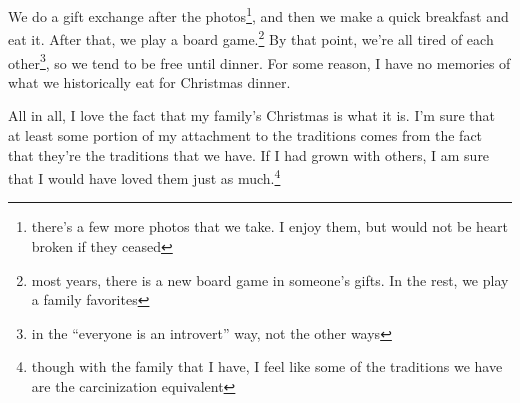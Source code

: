 \documentclass[12pt]{article}[titlepage]
\newcommand{\say}[1]{``#1''}
\newcommand{\1}{\={a}}
\newcommand{\2}{\={e}}
\newcommand{\3}{\={\i}}
\newcommand{\4}{\=o}
\newcommand{\5}{\=u}
\newcommand{\6}{\={A}}
\renewcommand{\,}{\textsuperscript{,}}
\begin{document}
We do a gift exchange after the photos\footnote{there's a few more photos that we take. I enjoy them, but would not be heart broken if they ceased}, and then we make a quick breakfast and eat it.
After that, we play a board game.\footnote{most years, there is a new board game in someone's gifts. In the rest, we play a family favorites}
By that point, we're all tired of each other\footnote{in the \say{everyone is an introvert} way, not the other ways}, so we tend to be free until dinner.
For some reason, I have no memories of what we historically eat for Christmas dinner.

All in all, I love the fact that my family's Christmas is what it is.
I'm sure that at least some portion of my attachment to the traditions comes from the fact that they're the traditions that we have.
If I had grown with others, I am sure that I would have loved them just as much.\footnote{though with the family that I have, I feel like some of the traditions we have are the carcinization equivalent}
\end{document}
